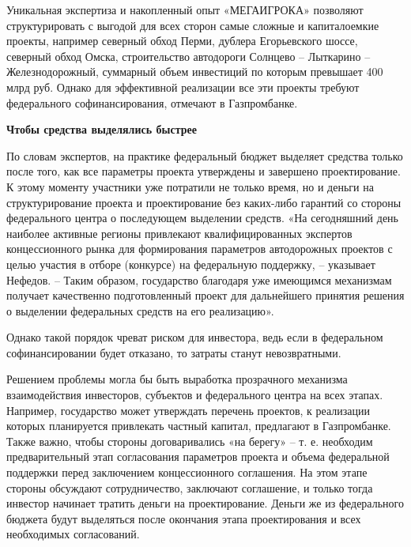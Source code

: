 Уникальная экспертиза и накопленный опыт «МЕГАИГРОКА» позволяют структурировать с выгодой для всех сторон самые сложные и капиталоемкие проекты, например северный обход Перми, дублера Егорьевского шоссе, северный обход Омска, строительство автодороги Солнцево – Лыткарино – Железнодорожный, суммарный объем инвестиций по которым превышает 400 млрд руб. Однако для эффективной реализации все эти проекты требуют федерального софинансирования, отмечают в Газпромбанке.

\textbf{Чтобы средства выделялись быстрее}



По словам экспертов, на практике федеральный бюджет выделяет средства только после того, как все параметры проекта утверждены и завершено проектирование. К этому моменту участники уже потратили не только время, но и деньги на структурирование проекта и проектирование без каких-либо гарантий со стороны федерального центра о последующем выделении средств. «На сегодняшний день наиболее активные регионы привлекают квалифицированных экспертов концессионного рынка для формирования параметров автодорожных проектов с целью участия в отборе (конкурсе) на федеральную поддержку, – указывает Нефедов. – Таким образом, государство благодаря уже имеющимся механизмам получает качественно подготовленный проект для дальнейшего принятия решения о выделении федеральных средств на его реализацию».

Однако такой порядок чреват риском для инвестора, ведь если в федеральном софинансировании будет отказано, то затраты станут невозвратными.



Решением проблемы могла бы быть выработка прозрачного механизма взаимодействия инвесторов, субъектов и федерального центра на всех этапах. Например, государство может утверждать перечень проектов, к реализации которых планируется привлекать частный капитал, предлагают в Газпромбанке. Также важно, чтобы стороны договаривались «на берегу» – т. е. необходим предварительный этап согласования параметров проекта и объема федеральной поддержки перед заключением концессионного соглашения. На этом этапе стороны обсуждают сотрудничество, заключают соглашение, и только тогда инвестор начинает тратить деньги на проектирование. Деньги же из федерального бюджета будут выделяться после окончания этапа проектирования и всех необходимых согласований.

